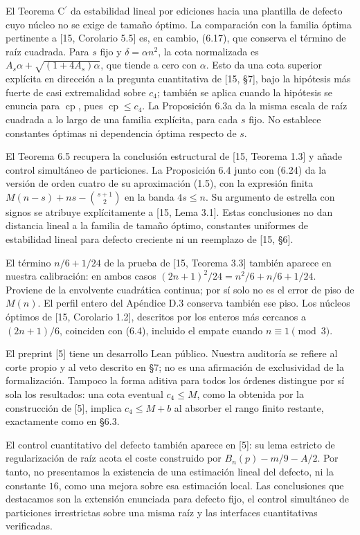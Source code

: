 \documentclass[spanish,11pt,a4paper]{article}
\begin{document}
El Teorema \texorpdfstring{C\ensuremath{^{\prime}}}{C'} da estabilidad lineal por ediciones hacia una plantilla de defecto cuyo núcleo no se exige de tamaño óptimo. La comparación con la familia óptima pertinente a {[}15, Corolario 5.5{]} es, en cambio, (6.17), que conserva el término de raíz cuadrada. Para \(s\) fijo y \(\delta=\alpha n^2\), la cota normalizada es \(A_s\alpha+\sqrt{(1+4A_s)\alpha}\), que tiende a cero con \(\alpha\). Esto da una cota superior explícita en dirección a la pregunta cuantitativa de {[}15, §7{]}, bajo la hipótesis más fuerte de casi extremalidad sobre \(c_4\); también se aplica cuando la hipótesis se enuncia para \(\operatorname{cp}\), pues \(\operatorname{cp}\le c_4\). La Proposición 6.3a da la misma escala de raíz cuadrada a lo largo de una familia explícita, para cada \(s\) fijo. No establece constantes óptimas ni dependencia óptima respecto de \(s\).

El Teorema 6.5 recupera la conclusión estructural de {[}15, Teorema 1.3{]} y añade control simultáneo de particiones. La Proposición 6.4 junto con (6.24) da la versión de orden cuatro de su aproximación (1.5), con la expresión finita \(M(n-s)+ns-\binom{s+1}{2}\) en la banda \(4s\le n\). Su argumento de estrella con signos se atribuye explícitamente a {[}15, Lema 3.1{]}. Estas conclusiones no dan distancia lineal a la familia de tamaño óptimo, constantes uniformes de estabilidad lineal para defecto creciente ni un reemplazo de {[}15, §6{]}.

El término \(n/6+1/24\) de la prueba de {[}15, Teorema 3.3{]} también aparece en nuestra calibración: en ambos casos \((2n+1)^2/24=n^2/6+n/6+1/24\). Proviene de la envolvente cuadrática continua; por sí solo no es el error de piso de \(M(n)\). El perfil entero del Apéndice D.3 conserva también ese piso. Los núcleos óptimos de {[}15, Corolario 1.2{]}, descritos por los enteros más cercanos a \((2n+1)/6\), coinciden con (6.4), incluido el empate cuando \(n\equiv1\pmod3\).

El preprint {[}5{]} tiene un desarrollo Lean público. Nuestra auditoría se refiere al corte propio y al veto descrito en §7; no es una afirmación de exclusividad de la formalización. Tampoco la forma aditiva para todos los órdenes distingue por sí sola los resultados: una cota eventual \(c_4\le M\), como la obtenida por la construcción de {[}5{]}, implica \(c_4\le M+b\) al absorber el rango finito restante, exactamente como en §6.3.

El control cuantitativo del defecto también aparece en {[}5{]}: su lema estricto de regularización de raíz acota el coste construido por \(B_n(p)-m/9-A/2\). Por tanto, no presentamos la existencia de una estimación lineal del defecto, ni la constante \(16\), como una mejora sobre esa estimación local. Las conclusiones que destacamos son la extensión enunciada para defecto fijo, el control simultáneo de particiones irrestrictas sobre una misma raíz y las interfaces cuantitativas verificadas.
\end{document}
